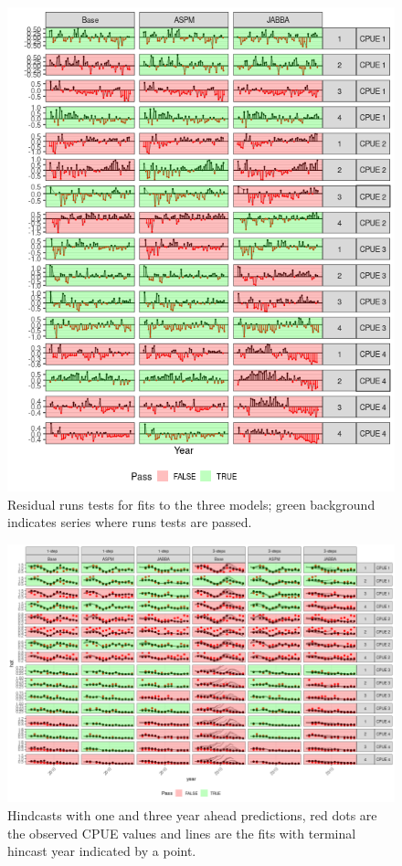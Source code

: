 \documentclass[a4paper]{article}
\begin{document}
\begin{figure}[htbp]
\centering
\includegraphics[width=6in]{final-cpue-residual-runs-1.png}
\caption{Residual runs tests for fits to the three models; green background indicates series where runs tests are passed.}
\label{fig:runs}
\end{figure}

\begin{figure}[htbp]
\centering
\includegraphics[width=6in]{final-hy-plot-all-1.png}
\caption{Hindcasts with one and three year ahead predictions, red dots are the observed CPUE values and lines are the fits with terminal hincast year indicated by a point.}
\label{fig:hy}
\end{figure}
\end{document}
